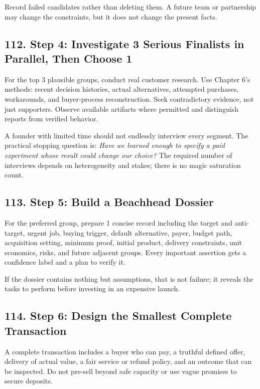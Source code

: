 Record failed candidates rather than deleting them. A future team or partnership may change the constraints, but it does not change the present facts.

\subsection*{112. Step 4: Investigate 3 Serious Finalists in Parallel, Then Choose 1}

For the top 3 plausible groups, conduct real customer research. Use Chapter 6's methods: recent decision histories, actual alternatives, attempted purchases, workarounds, and buyer-process reconstruction. Seek contradictory evidence, not just supporters. Observe available artifacts where permitted and distinguish reports from verified behavior.

A founder with limited time should not endlessly interview every segment. The practical stopping question is: \emph{Have we learned enough to specify a paid experiment whose result could change our choice?} The required number of interviews depends on heterogeneity and stakes; there is no magic saturation count.

\subsection*{113. Step 5: Build a Beachhead Dossier}

For the preferred group, prepare 1 concise record including the target and anti-target, urgent job, buying trigger, default alternative, payer, budget path, acquisition setting, minimum proof, initial product, delivery constraints, unit economics, risks, and future adjacent groups. Every important assertion gets a confidence label and a plan to verify it.

If the dossier contains nothing but assumptions, that is not failure; it reveals the tasks to perform before investing in an expensive launch.

\subsection*{114. Step 6: Design the Smallest Complete Transaction}

A complete transaction includes a buyer who can pay, a truthful defined offer, delivery of actual value, a fair service or refund policy, and an outcome that can be inspected. Do not pre-sell beyond safe capacity or use vague promises to secure deposits.

